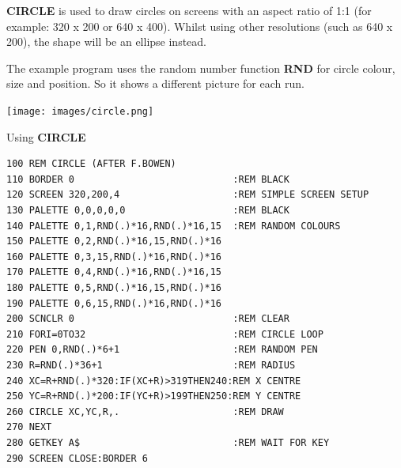 \begin{description}[leftmargin=2cm,style=nextline]
\item [Remarks:] {\bf CIRCLE} is used to draw circles on
               screens with an aspect ratio of 1:1 (for example: 320 x 200
               or 640 x 400). Whilst using other resolutions (such as 640 x 200),
               the shape will be an ellipse instead.

               The example program uses the random number function
               {\bf RND} for circle colour, size and position.
               So it shows a different picture for each run.

\item \begin{center}\texttt{[image: images/circle.png]}\end{center}
\newpage

\item [Example:] Using {\bf CIRCLE}
\begin{tcolorbox}[colback=black,coltext=white]
\verbatimfont{\codefont}
\begin{verbatim}
100 REM CIRCLE (AFTER F.BOWEN)
110 BORDER 0                            :REM BLACK
120 SCREEN 320,200,4                    :REM SIMPLE SCREEN SETUP
130 PALETTE 0,0,0,0,0                   :REM BLACK
140 PALETTE 0,1,RND(.)*16,RND(.)*16,15  :REM RANDOM COLOURS
150 PALETTE 0,2,RND(.)*16,15,RND(.)*16
160 PALETTE 0,3,15,RND(.)*16,RND(.)*16
170 PALETTE 0,4,RND(.)*16,RND(.)*16,15
180 PALETTE 0,5,RND(.)*16,15,RND(.)*16
190 PALETTE 0,6,15,RND(.)*16,RND(.)*16
200 SCNCLR 0                            :REM CLEAR
210 FORI=0TO32                          :REM CIRCLE LOOP
220 PEN 0,RND(.)*6+1                    :REM RANDOM PEN
230 R=RND(.)*36+1                       :REM RADIUS
240 XC=R+RND(.)*320:IF(XC+R)>319THEN240:REM X CENTRE
250 YC=R+RND(.)*200:IF(YC+R)>199THEN250:REM Y CENTRE
260 CIRCLE XC,YC,R,.                    :REM DRAW
270 NEXT
280 GETKEY A$                           :REM WAIT FOR KEY
290 SCREEN CLOSE:BORDER 6
\end{verbatim}
\end{tcolorbox}
\end{description}


\newpage
